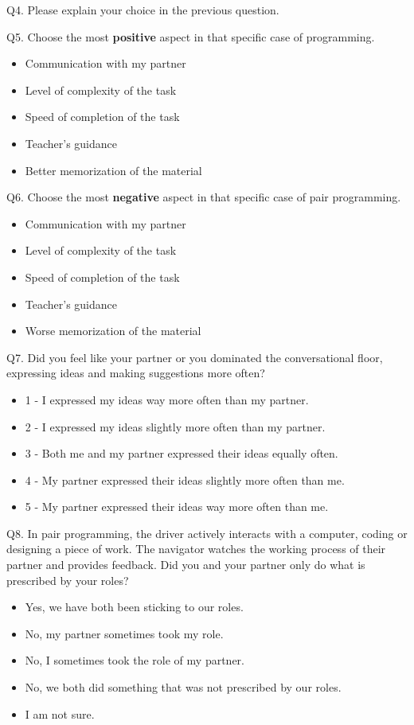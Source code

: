 \documentclass[conference]{IEEEtran}
\begin{document}
Q4. Please explain your choice in the previous question.  
    
Q5. Choose the most \textbf{positive} aspect in that specific case of programming.
    \begin{itemize}
        \item Communication with my partner
        \item Level of complexity of the task
        \item Speed of completion of the task
        \item Teacher's guidance
        \item Better memorization of the material
    \end{itemize}
    
Q6. Choose the most \textbf{negative} aspect in that specific case of pair programming.
    \begin{itemize}
        \item Communication with my partner
        \item Level of complexity of the task
        \item Speed of completion of the task
        \item Teacher's guidance
        \item Worse memorization of the material
    \end{itemize}
    
Q7. Did you feel like your partner or you dominated the conversational floor, expressing ideas and making suggestions more often?
    \begin{itemize}
        \item 1 - I expressed my ideas way more often than my partner.
        \item 2 - I expressed my ideas slightly more often than my partner.
        \item 3 - Both me and my partner expressed their ideas equally often.
        \item 4 - My partner expressed their ideas slightly more often than me.
        \item 5 - My partner expressed their ideas way more often than me.
    \end{itemize}

Q8. In pair programming, the driver actively interacts with a computer, coding or designing a piece of work. The navigator watches the working process of their partner and provides feedback. Did you and your partner only do what is prescribed by your roles?
    \begin{itemize}
        \item Yes, we have both been sticking to our roles.
        \item No, my partner sometimes took my role.
        \item No, I sometimes took the role of my partner.
        \item No, we both did something that was not prescribed by our roles.
        \item I am not sure.
    \end{itemize}
\end{document}
